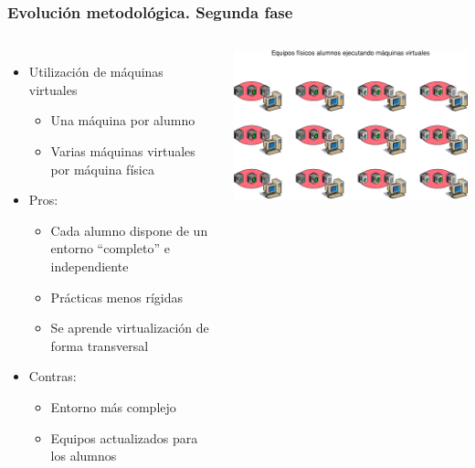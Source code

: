 \documentclass{beamer}
\begin{document}
\begin{frame}
  \frametitle{Evolución metodológica. Segunda fase}
  \begin{columns}
    \begin{itemize}
    \item Utilización de máquinas virtuales
      \begin{itemize}
      \item Una máquina por alumno
      \item Varias máquinas virtuales por máquina física
      \end{itemize}
      \item Pros:
      \begin{itemize}
      \item Cada alumno dispone de un entorno ``completo'' e independiente
      \item Prácticas menos rígidas
      \item Se aprende virtualización de forma transversal
      \end{itemize}
      \item Contras:
      \begin{itemize}
      \item Entorno más complejo
      \item Equipos actualizados para los alumnos
      \end{itemize}
    \end{itemize}
    \includegraphics[width=\columnwidth]{../img/epoca2.png}
  \end{columns}
\end{frame}
\end{document}
